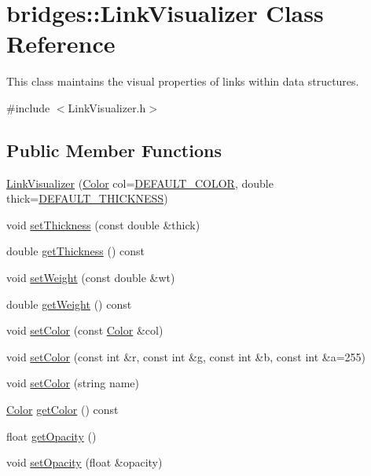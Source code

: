 \hypertarget{classbridges_1_1_link_visualizer}{}\section{bridges\+:\+:Link\+Visualizer Class Reference}
\label{classbridges_1_1_link_visualizer}


This class maintains the visual properties of links within data structures.  




{\ttfamily \#include $<$Link\+Visualizer.\+h$>$}

\subsection*{Public Member Functions}
\begin{DoxyCompactItemize}
\item 
\hyperlink{classbridges_1_1_link_visualizer_aeb26445f5823fe1ccee1c2dd9c27fb90}{Link\+Visualizer} (\hyperlink{classbridges_1_1_color}{Color} col=\hyperlink{classbridges_1_1_link_visualizer_a7698ad5b243041377d81152a339d1282}{D\+E\+F\+A\+U\+L\+T\+\_\+\+C\+O\+L\+O\+R}, double thick=\hyperlink{classbridges_1_1_link_visualizer_ab790c33080c769008114db34d5ec8950}{D\+E\+F\+A\+U\+L\+T\+\_\+\+T\+H\+I\+C\+K\+N\+E\+S\+S})
\item 
void \hyperlink{classbridges_1_1_link_visualizer_a932d7408b8010c782a42aa02903b8ec6}{set\+Thickness} (const double \&thick)
\item 
double \hyperlink{classbridges_1_1_link_visualizer_a22513552576c20a13d6fd81348abb815}{get\+Thickness} () const 
\item 
void \hyperlink{classbridges_1_1_link_visualizer_a08b606d2451026a11e110d0b94f97538}{set\+Weight} (const double \&wt)
\item 
double \hyperlink{classbridges_1_1_link_visualizer_a82b0992294de2dad264c32b33f9a87b7}{get\+Weight} () const 
\item 
void \hyperlink{classbridges_1_1_link_visualizer_adedc1f2b7d5d562b115ef9d8ae19fa73}{set\+Color} (const \hyperlink{classbridges_1_1_color}{Color} \&col)
\item 
void \hyperlink{classbridges_1_1_link_visualizer_a138cb68eb0e2d089bf70e0ca187246c3}{set\+Color} (const int \&r, const int \&g, const int \&b, const int \&a=255)
\item 
void \hyperlink{classbridges_1_1_link_visualizer_a9fc861a28c81944b224af019523416fc}{set\+Color} (string name)
\item 
\hyperlink{classbridges_1_1_color}{Color} \hyperlink{classbridges_1_1_link_visualizer_a4b244bde324fc61c262954e590db20a6}{get\+Color} () const 
\item 
float \hyperlink{classbridges_1_1_link_visualizer_a920f44fbef02adf01906323bb4fb2994}{get\+Opacity} ()
\item 
void \hyperlink{classbridges_1_1_link_visualizer_a0d27aa1204086122e262a125fe3648b1}{set\+Opacity} (float \&opacity)
\end{DoxyCompactItemize}
